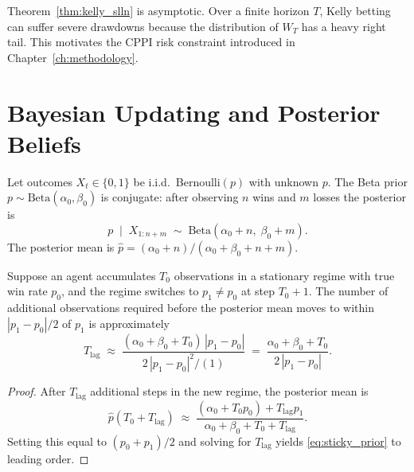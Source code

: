 \begin{remark}
\label{rem:finite_horizon}
Theorem~\ref{thm:kelly_slln} is asymptotic.  Over a finite horizon $T$,
Kelly betting can suffer severe drawdowns because the distribution of $W_T$
has a heavy right tail.  This motivates the CPPI risk constraint introduced
in Chapter~\ref{ch:methodology}.
\end{remark}

\section{Bayesian Updating and Posterior Beliefs}

\begin{definition}
\label{def:beta_bernoulli}
Let outcomes $X_t \in \{0,1\}$ be i.i.d.\ Bernoulli$(p)$ with unknown $p$.
The Beta prior $p \sim \mathrm{Beta}(\alpha_0,\beta_0)$ is conjugate: after
observing $n$ wins and $m$ losses the posterior is
\begin{equation}
    p \;\mid\; X_{1:n+m} \;\sim\; \mathrm{Beta}(\alpha_0+n,\;\beta_0+m).
    \label{eq:beta_posterior}
\end{equation}
The posterior mean is $\hat p = (\alpha_0+n)/(\alpha_0+\beta_0+n+m)$.
\end{definition}

\begin{proposition}
\label{prop:sticky_prior}
Suppose an agent accumulates $T_0$ observations in a stationary regime with
true win rate $p_0$, and the regime switches to $p_1 \neq p_0$ at step
$T_0+1$.  The number of additional observations required before the posterior
mean moves to within $|p_1-p_0|/2$ of $p_1$ is approximately
\begin{equation}
    T_{\mathrm{lag}} \;\approx\;
    \frac{(\alpha_0+\beta_0+T_0)\,|p_1-p_0|}{2\,|p_1-p_0|^2/(1)}
    \;=\; \frac{\alpha_0+\beta_0+T_0}{2\,|p_1-p_0|}.
    \label{eq:sticky_prior}
\end{equation}
\end{proposition}

\begin{proof}
After $T_{\mathrm{lag}}$ additional steps in the new regime, the posterior mean is
\[
    \hat p(T_0+T_{\mathrm{lag}})
    \;\approx\;
    \frac{(\alpha_0 + T_0 p_0) + T_{\mathrm{lag}} p_1}
         {\alpha_0+\beta_0+T_0+T_{\mathrm{lag}}}.
\]
Setting this equal to $(p_0+p_1)/2$ and solving for $T_{\mathrm{lag}}$ yields
\eqref{eq:sticky_prior} to leading order.
\end{proof}

